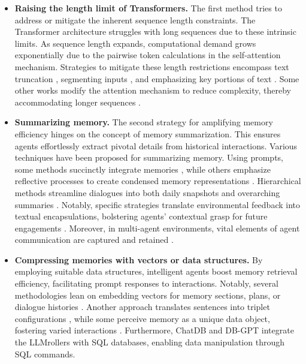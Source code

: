 \begin{itemize}[leftmargin=*]
    \item \textbf{Raising the length limit of Transformers.} The first method tries to address or mitigate the inherent sequence length constraints. The Transformer architecture struggles with long sequences due to these intrinsic limits. As sequence length expands, computational demand grows exponentially due to the pairwise token calculations in the self-attention mechanism. Strategies to mitigate these length restrictions encompass text truncation \cite{DBLP:conf/acl/LewisLGGMLSZ20,DBLP:conf/acl/ParkVS22,DBLP:conf/acl/ZhangWZ19}, segmenting inputs \cite{DBLP:journals/corr/abs-2305-16300,DBLP:journals/corr/abs-2210-05529}, and emphasizing key portions of text \cite{ DBLP:conf/emnlp/NieH0M22,DBLP:journals/corr/abs-2305-01625,DBLP:conf/emnlp/ManakulG21}. Some other works modify the attention mechanism to reduce complexity, thereby accommodating longer sequences \cite{DBLP:conf/nips/ZaheerGDAAOPRWY20,DBLP:conf/naacl/GuoAUONSY22,DBLP:journals/corr/abs-2303-09752,DBLP:conf/acl/RuossDGGCBLV23}. 

    \item \textbf{Summarizing memory.} The second strategy for amplifying memory efficiency hinges on the concept of memory summarization. This ensures agents effortlessly extract pivotal details from historical interactions. Various techniques have been proposed for summarizing memory. Using prompts, some methods succinctly integrate memories \cite{DBLP:journals/corr/abs-2304-13343}, while others emphasize reflective processes to create condensed memory representations \cite{DBLP:journals/corr/abs-2304-03442, DBLP:journals/corr/abs-2308-10144}. Hierarchical methods streamline dialogues into both daily snapshots and overarching summaries \cite{DBLP:journals/corr/abs-2305-10250}. Notably, specific strategies translate environmental feedback into textual encapsulations, bolstering agents' contextual grasp for future engagements \cite{DBLP:journals/corr/abs-2303-11366}. Moreover, in multi-agent environments, vital elements of agent communication are captured and retained \cite{DBLP:journals/corr/abs-2308-07201}.

    \item \textbf{Compressing memories with vectors or data structures.} By employing suitable data structures, intelligent agents boost memory retrieval efficiency, facilitating prompt responses to interactions. Notably, several methodologies lean on embedding vectors for memory sections, plans, or dialogue histories \cite{DBLP:journals/corr/abs-2307-07924,DBLP:journals/corr/abs-2305-10250,DBLP:journals/corr/abs-2305-17144,DBLP:journals/corr/abs-2308-04026}. Another approach translates sentences into triplet configurations \cite{DBLP:journals/corr/abs-2305-14322}, while some perceive memory as a unique data object, fostering varied interactions \cite{DBLP:journals/corr/abs-2308-01542}. Furthermore, ChatDB \cite{DBLP:journals/corr/abs-2306-03901} and DB-GPT \cite{DBLP:journals/corr/abs-2308-05481} integrate the LLMrollers with SQL databases, enabling data manipulation through SQL commands.
\end{itemize}

